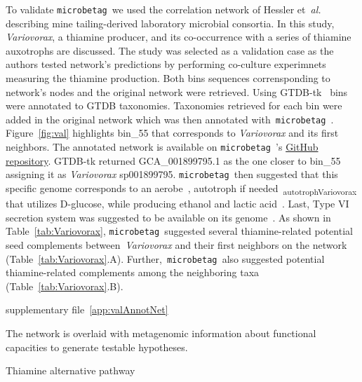 \documentclass[sn-mathphys,Numbered]{sn-jnl}  %
\theoremstyle{thmstyleone}%
\theoremstyle{thmstyletwo}%
\theoremstyle{thmstylethree}%
\newcommand{\microbetag}{\texttt{microbetag }}
\begin{document}
        To validate \microbetag we used the correlation network of Hessler et~\textit{al.}~\cite{hessler2023vitamin} describing mine tailing-derived laboratory microbial consortia.
        In this study, \textit{Variovorax}, a thiamine producer, and its co-occurrence with a series of thiamine auxotrophs are discussed.
        The study was selected as a validation case as the authors tested network's predictions by performing co-culture experimnets measuring the thiamine production. 
        Both bins sequences corrensponding to network's nodes and the original network were retrieved. 
        Using GTDB-tk~\cite{chaumeil2020gtdb} bins were annotated to GTDB taxonomies.
        Taxonomies retrieved for each bin were added in the original network which was then annotated with~\microbetag.
        Figure~\ref{fig:val} highlights bin\_55 that corresponds to \textit{Variovorax} and its first neighbors.
        The annotated network is available on \microbetag's \href{https://github.com/hariszaf/microbetag/blob/develop/tests/validation_case/microbetag_val.cx}{GitHub repository}.
        GTDB-tk returned GCA\_001899795.1 as the one closer to bin\_55 assigning it as \textit{Variovorax} sp001899795.
        \microbetag then suggested that this specific genome corresponds to an aerobe~\cite{aerobeVariovorax}, autotroph if needed~\textsubscript{autotrophVariovorax} that utilizes D-glucose, while producing ethanol and lactic acid~\cite{lacticVariovorax}. 
        Last, Type VI secretion system was suggested to be available on its genome~\cite{t6ssVariovorax}.
        As shown in Table~\ref{tab:Variovorax}, \microbetag suggested several thiamine-related potential seed complements between~\textit{Variovorax} and their first neighbors on the network (Table~\ref{tab:Variovorax}.A).
        Further,~\microbetag also suggested potential thiamine-related complements among the neighboring taxa (Table~\ref{tab:Variovorax}.B).


        supplementary file~\ref{app:valAnnotNet}


 
        The network is overlaid with metagenomic information about functional capacities to generate testable hypotheses.


        Thiamine alternative pathway~\cite{llavero2022thiamine, romine2017underlying}


\end{document}
